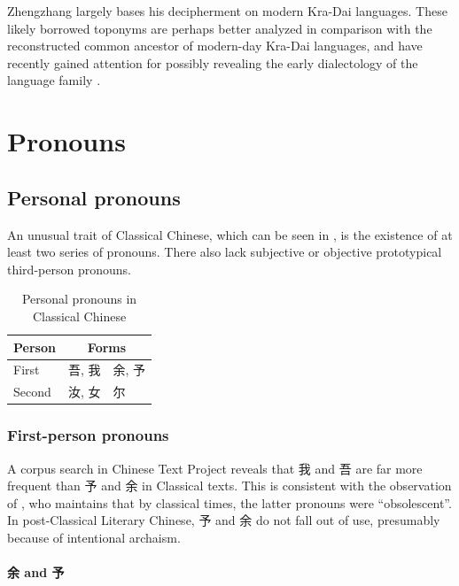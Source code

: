 \documentclass[UTF8, a4paper, oneside, scheme=plain, 12pt]{ctexrep}
\newcommand*{\citepage}[1]{p.~{#1}}
\begin{document}
Zhengzhang largely bases his decipherment on modern Kra-Dai languages.
These likely borrowed toponyms are perhaps better analyzed in comparison with the reconstructed  common ancestor of modern-day Kra-Dai languages,
and have recently gained attention for possibly revealing the early dialectology of the language family \citep{xia20206kradai}.

\chapter{Pronouns}

\section{Personal pronouns}

An unusual trait of Classical Chinese, which can be seen in , 
is the existence of at least two series of pronouns.
There also lack subjective or objective prototypical third-person pronouns.

\begin{table}[H]
    \caption{Personal pronouns in Classical Chinese}
    \label{tbl:personal-pronouns}
    \centering
    \begin{tabular}{lll}
        \toprule
        Person & \multicolumn{2}{c}{Forms} \\
        \midrule
        First & 吾, 我 & 余, 予 \\
        Second & 汝, 女 & 尔 \\
        \bottomrule
    \end{tabular}
\end{table}

\subsection{First-person pronouns}

A corpus search in Chinese Text Project reveals that 我 and 吾 are far more frequent than 予 and 余 in Classical texts.
This is consistent with the observation of \citet[\citepage{76}]{pulleyblank1995outline},
who maintains that by classical times, the latter pronouns were ``obsolescent''.
In post-Classical Literary Chinese, 予 and 余 do not fall out of use,
presumably because of intentional archaism.

\subsubsection{余 and 予}
\end{document}
